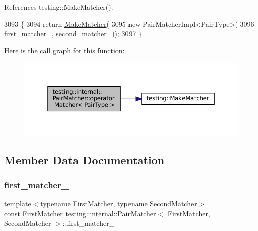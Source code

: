 References testing\+::\+Make\+Matcher().


\begin{DoxyCode}
3093                                       \{
3094     \textcolor{keywordflow}{return} \hyperlink{namespacetesting_a37fd8029ac00e60952440a3d9cca8166}{MakeMatcher}(
3095         \textcolor{keyword}{new} PairMatcherImpl<PairType>(
3096             \hyperlink{classtesting_1_1internal_1_1PairMatcher_ac3e59612dd93bddb7ce606ab4419bc26}{first\_matcher\_}, \hyperlink{classtesting_1_1internal_1_1PairMatcher_a2ff03fa2ac3d715052feb21b7b61084d}{second\_matcher\_}));
3097   \}
\end{DoxyCode}
Here is the call graph for this function\+:
\nopagebreak
\begin{figure}[H]
\begin{center}
\leavevmode
\includegraphics[width=350pt]{classtesting_1_1internal_1_1PairMatcher_ae9461cc22148c6b15ad94eb5ad7c8a50_cgraph}
\end{center}
\end{figure}


\subsection{Member Data Documentation}
\mbox{\label{classtesting_1_1internal_1_1PairMatcher_ac3e59612dd93bddb7ce606ab4419bc26}} 
\subsubsection{\texorpdfstring{first\+\_\+matcher\+\_\+}{first\_matcher\_}}
{\footnotesize\ttfamily template$<$typename First\+Matcher, typename Second\+Matcher$>$ \\
const First\+Matcher \hyperlink{classtesting_1_1internal_1_1PairMatcher}{testing\+::internal\+::\+Pair\+Matcher}$<$ First\+Matcher, Second\+Matcher $>$\+::first\+\_\+matcher\+\_\+\hspace{0.3cm}{\ttfamily [private]}}



